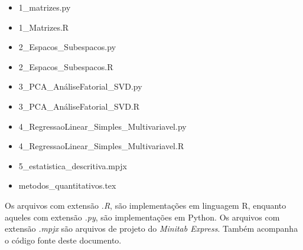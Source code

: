 \documentclass{article}
\begin{document}
\begin{itemize}
    \item  1\_matrizes.py
    \item  1\_Matrizes.R
    \item  2\_Espacos\_Subespacos.py
    \item  2\_Espacos\_Subespacos.R
    \item  3\_PCA\_AnáliseFatorial\_SVD.py
    \item  3\_PCA\_AnáliseFatorial\_SVD.R
    \item  4\_RegressaoLinear\_Simples\_Multivariavel.py
    \item  4\_RegressaoLinear\_Simples\_Multivariavel.R
    \item  5\_estatistica\_descritiva.mpjx
    \item  metodos\_quantitativos.tex

\end{itemize}

Os arquivos com extensão \emph{.R}, são implementações em linguagem R, enquanto aqueles com extensão \emph{.py}, são implementações em Python. Os arquivos com extensão \emph{.mpjx} são arquivos de projeto do \emph{Minitab Express}. Também acompanha o código fonte deste documento.
\end{document}
